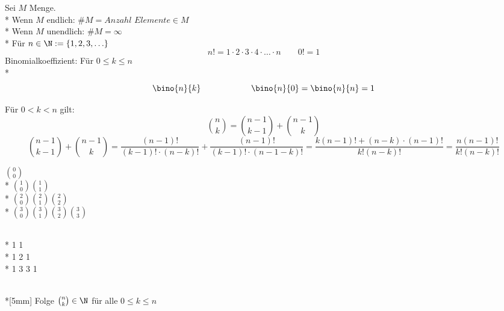 %
\wdh
Sei $M$ Menge.\\*
Wenn $M$ endlich: $\#M=Anzahl$ $Elemente\in M$\\*
Wenn $M$ unendlich: $\#M=\infty$\\*
Für $n\in \N:=\{1,2,3,\ldots\}$
$$n!=1 · 2 · 3 · 4 · … · n \qquad 0!=1$$
Binomialkoeffizient: Für $0\leq k\leq n$\\*
$$\bino{n}{k} \qquad\qquad\qquad \bino{n}{0}=\bino{n}{n}=1$$

Für $0<k< n$ gilt:
$$\binom{n}{k} = \binom{n -1}{k-1} + \binom{n-1}{k}$$
%
\bew 
$$\binom{n-1}{k-1}+ \binom{n-1}{k}=\frac{(n-1)!}{(k-1)!·(n-k)!} +\frac{(n-1)!}{(k-1)!·(n-1-k)!} = \frac{k(n-1)!+(n-k)\cdot(n-1)!}{k! (n-k)!}=\frac{n(n-1)!}{k!(n-k)!}$$

\parbox{0.4\textwidth}{\centering
$\binom{0}{0}$\\*
$\binom{1}{0} \binom{1}{1}$\\*
$\binom{2}{0} \binom{2}{1} \binom{2}{2}$\\*
$\binom{3}{0} \binom{3}{1} \binom{3}{2} \binom{3}{3}$}\hfill
\parbox{0.4\textwidth}{\\*
1 1\\*
1 2 1\\*
1 3 3 1}\\*[5mm]
Folge $\binom{n}{k}\in \N$ für alle $0\leq k\leq n$

